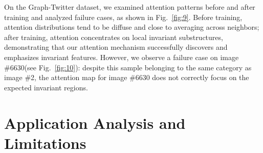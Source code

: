 \documentclass[a4paper,fleqn]{cas-dc}
\begin{document}
{On the Graph-Twitter\cite{dong2014adaptive} dataset, we examined attention patterns before and after training and analyzed failure cases, as shown in Fig.~\ref{fig:9}. Before training, attention distributions tend to be diffuse and close to averaging across neighbors; after training, attention concentrates on local invariant substructures, demonstrating that our attention mechanism successfully discovers and emphasizes invariant features. However, we observe a failure case on image \#6630(see Fig.~\ref{fig:10}): despite this sample belonging to the same category as image \#2, the attention map for image \#6630 does not correctly focus on the expected invariant regions.}


\section{Application Analysis and Limitations}
\end{document}
